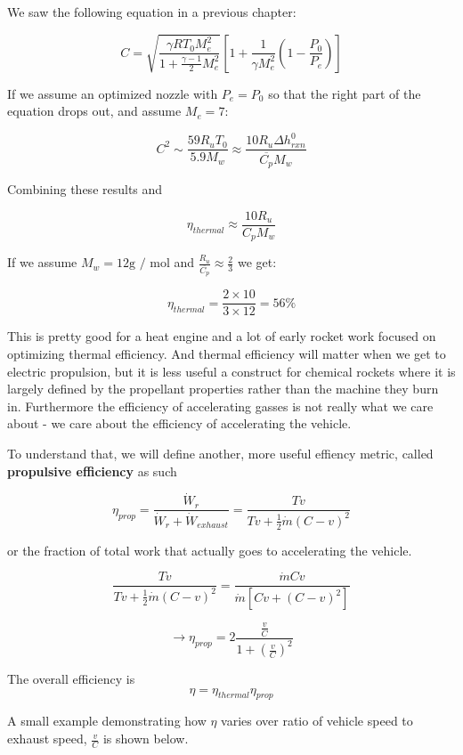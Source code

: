 \documentclass[twocolumn]{memoir} %
\begin{document}
We saw the following equation in a previous chapter:

\[C = \sqrt{\frac{\gamma R T_0 M_e^2}{1+\frac{\gamma-1}{2}M_e^2}} \left[1 +\frac{1}{\gamma M_e^2}\left(1-\frac{P_0}{P_e}\right)\right]\]

If we assume an optimized nozzle with \(P_e = P_0\) so that the right
part of the equation drops out, and assume \(M_e = 7\):

\[C^2 \sim \frac{59R_uT_0}{5.9M_w} \approx \frac{10 R_u\Delta h^0_{rxn}}{\overline{C_p}M_w}\]

Combining these results and

\[\eta_{thermal} \approx \frac{10R_u}{C_p M_w}\]

If we assume \(M_w = 12 \text{g / mol}\) and
\(\frac{R_u}{\overline{C_p}} \approx \frac{2}{3}\) we get:

\[\eta_{thermal} = \frac{2 \times 10}{3 \times 12} = 56\%\]

This is pretty good for a heat engine and a lot of early rocket work focused on optimizing thermal efficiency.  And thermal efficiency will matter when we get to electric propulsion, but it is less useful a construct for chemical rockets where it is largely defined by the propellant properties rather than the machine they burn in.  Furthermore the efficiency of
accelerating gasses is not really what we care about - we care about the
efficiency of accelerating the vehicle.

    To understand that, we will define another, more useful effiency metric, called
\textbf{propulsive efficiency} as such

\[\eta_{prop} = \frac{\dot{W}_{r}}{\dot{W}_{r} + \dot{W}_{exhaust}} = \frac{Tv}{Tv + \frac{1}{2}\dot{m}(C - v)^2}\]

or the fraction of total work that actually goes to accelerating the
vehicle.

\[\frac{Tv}{Tv + \frac{1}{2}\dot{m}(C - v)^2} = \frac{\dot{m}C v}{\dot{m}\left[C v + (C-v)^2\right]}\]

\[\rightarrow \eta_{prop} = 2\frac{\frac{v}{C}}{1+(\frac{v}{C})^2}\]

The overall efficiency is \[\eta = \eta_{thermal}\eta_{prop}\]

A small example demonstrating how \(\eta\) varies over ratio of vehicle
speed to exhaust speed, \(\frac{v}{C}\) is shown below.
\end{document}
